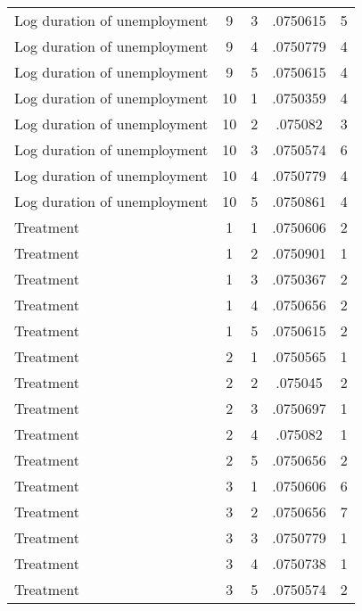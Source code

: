 \begin{tabular}{l*{4}{c}}
Log duration of unemployment&           9&           3&    .0750615&           5\\
Log duration of unemployment&           9&           4&    .0750779&           4\\
Log duration of unemployment&           9&           5&    .0750615&           4\\
Log duration of unemployment&          10&           1&    .0750359&           4\\
Log duration of unemployment&          10&           2&     .075082&           3\\
Log duration of unemployment&          10&           3&    .0750574&           6\\
Log duration of unemployment&          10&           4&    .0750779&           4\\
Log duration of unemployment&          10&           5&    .0750861&           4\\
Treatment           &           1&           1&    .0750606&           2\\
Treatment           &           1&           2&    .0750901&           1\\
Treatment           &           1&           3&    .0750367&           2\\
Treatment           &           1&           4&    .0750656&           2\\
Treatment           &           1&           5&    .0750615&           2\\
Treatment           &           2&           1&    .0750565&           1\\
Treatment           &           2&           2&     .075045&           2\\
Treatment           &           2&           3&    .0750697&           1\\
Treatment           &           2&           4&     .075082&           1\\
Treatment           &           2&           5&    .0750656&           2\\
Treatment           &           3&           1&    .0750606&           6\\
Treatment           &           3&           2&    .0750656&           7\\
Treatment           &           3&           3&    .0750779&           1\\
Treatment           &           3&           4&    .0750738&           1\\
Treatment           &           3&           5&    .0750574&           2\\

\end{tabular}
